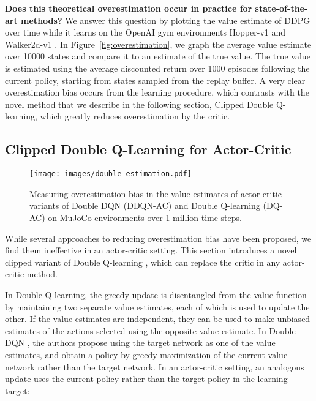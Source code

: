 \documentclass{article}
\begin{document}
\textbf{Does this theoretical overestimation occur in practice for state-of-the-art methods?} We answer this question by plotting the value estimate of DDPG \cite{DDPG} over time while it learns on the OpenAI gym environments Hopper-v1 and Walker2d-v1 \cite{OpenAIGym}. In Figure~\ref{fig:overestimation}, we graph the average value estimate over 10000 states and compare it to an estimate of the true value. The true value is estimated using the average discounted return over 1000 episodes following the current policy, starting from states sampled from the replay buffer. A very clear overestimation bias occurs from the learning procedure, which contrasts with the novel method that we describe in the following section, Clipped Double Q-learning, which greatly reduces overestimation by the critic. 

\subsection{Clipped Double Q-Learning for Actor-Critic} \label{sec:cdq}


\begin{figure} 
\centering
\captionsetup[subfloat]{captionskip=-8pt}
\texttt{[image: images/double\_estimation.pdf]}
\subfloat[Hopper-v1]{\hspace{0.56\linewidth}}
\subfloat[Walker2d-v1]{\hspace{0.44\linewidth}}
\caption{Measuring overestimation bias in the value estimates of actor critic variants of Double DQN (DDQN-AC) and Double Q-learning (DQ-AC) on MuJoCo environments over 1 million time steps.}
\label{fig:doubleestimation}
\end{figure}

While several approaches to reducing overestimation bias have been proposed, we find them ineffective in an actor-critic setting. This section introduces a novel clipped variant of Double Q-learning \cite{hasselt2010double}, which can replace the critic in any actor-critic method. 

In Double Q-learning, the greedy update is disentangled from the value function by maintaining two separate value estimates, each of which is used to update the other. If the value estimates are independent, they can be used to make unbiased estimates of the actions selected using the opposite value estimate. In Double DQN \cite{DoubleDQN}, the authors propose using the target network as one of the value estimates, and obtain a policy by greedy maximization of the current value network rather than the target network. In an actor-critic setting, an analogous update uses the current policy rather than the target policy in the learning target:
\end{document}
